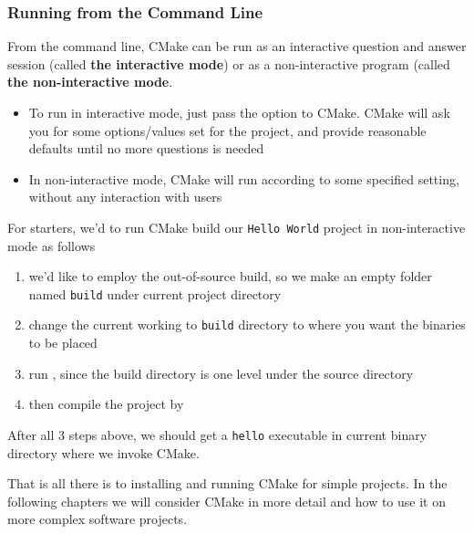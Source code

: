 \subsubsection{Running from the Command Line}
  From the command line, CMake can be run as an interactive question and answer session (called \textbf{the interactive mode}) or as a non-interactive program (called \textbf{the non-interactive mode}.\par
  \begin{itemize}  
    \item To run in interactive mode, just pass the  option to CMake. CMake will ask you for some options/values set for the project, and provide reasonable defaults until no more questions is needed
    \item In non-interactive mode, CMake will run according to some specified setting, without any interaction with users
  \end{itemize}  
    For starters, we'd to run CMake build our \texttt{Hello World} project in non-interactive mode as follows
  \begin{enumerate}    
    \item we'd like to employ the out-of-source build, so we make an empty folder named \texttt{build} under current project directory
    \item change the current working to \texttt{build} directory to where you want the binaries to be placed
    \item run , since the build directory is one level under the source directory
    \item then compile the project by 
  \end{enumerate}    
  After all 3 steps above, we should get a \texttt{hello} executable in current binary directory where we invoke CMake.\par 
	That is all there is to installing and running CMake for simple projects. In the following chapters we will consider CMake in more detail and how to use it on more complex software projects.
